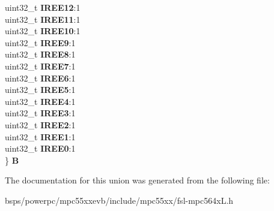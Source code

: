 \begin{DoxyCompactItemize}
\begin{tabbing}
\>uint32\_t {\bfseries IREE12}:1\\
\>uint32\_t {\bfseries IREE11}:1\\
\>uint32\_t {\bfseries IREE10}:1\\
\>uint32\_t {\bfseries IREE9}:1\\
\>uint32\_t {\bfseries IREE8}:1\\
\>uint32\_t {\bfseries IREE7}:1\\
\>uint32\_t {\bfseries IREE6}:1\\
\>uint32\_t {\bfseries IREE5}:1\\
\>uint32\_t {\bfseries IREE4}:1\\
\>uint32\_t {\bfseries IREE3}:1\\
\>uint32\_t {\bfseries IREE2}:1\\
\>uint32\_t {\bfseries IREE1}:1\\
\>uint32\_t {\bfseries IREE0}:1\\
\} {\bfseries B}\\

\end{tabbing}\end{DoxyCompactItemize}


The documentation for this union was generated from the following file\+:\begin{DoxyCompactItemize}
\item 
bsps/powerpc/mpc55xxevb/include/mpc55xx/fsl-\/mpc564x\+L.\+h\end{DoxyCompactItemize}
